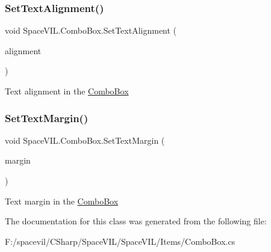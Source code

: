 \mbox{\label{class_space_v_i_l_1_1_combo_box_a43bcc26da1d80a462c541aea0a830b56}} 
\subsubsection{\texorpdfstring{Set\+Text\+Alignment()}{SetTextAlignment()}}
{\footnotesize\ttfamily void Space\+V\+I\+L.\+Combo\+Box.\+Set\+Text\+Alignment (\begin{DoxyParamCaption}\item[{Item\+Alignment}]{alignment }\end{DoxyParamCaption})\hspace{0.3cm}{\ttfamily [inline]}}



Text alignment in the \mbox{\hyperlink{class_space_v_i_l_1_1_combo_box}{Combo\+Box}} 

\mbox{\label{class_space_v_i_l_1_1_combo_box_ad770a207c2e8525603e55f584605299b}} 
\subsubsection{\texorpdfstring{Set\+Text\+Margin()}{SetTextMargin()}}
{\footnotesize\ttfamily void Space\+V\+I\+L.\+Combo\+Box.\+Set\+Text\+Margin (\begin{DoxyParamCaption}\item[{\mbox{\hyperlink{struct_space_v_i_l_1_1_decorations_1_1_indents}{Indents}}}]{margin }\end{DoxyParamCaption})\hspace{0.3cm}{\ttfamily [inline]}}



Text margin in the \mbox{\hyperlink{class_space_v_i_l_1_1_combo_box}{Combo\+Box}} 



The documentation for this class was generated from the following file\+:\begin{DoxyCompactItemize}
\item 
F\+:/spacevil/\+C\+Sharp/\+Space\+V\+I\+L/\+Space\+V\+I\+L/\+Items/Combo\+Box.\+cs\end{DoxyCompactItemize}
